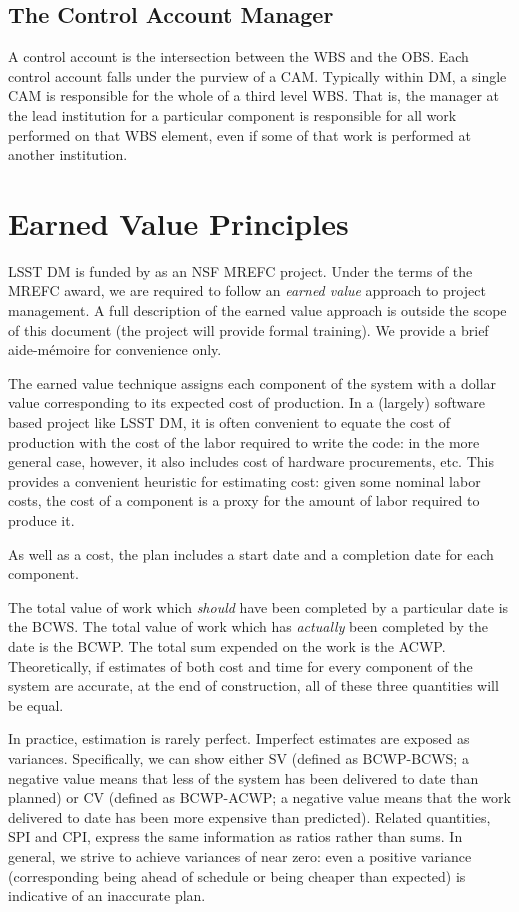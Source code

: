 \subsection{The Control Account
Manager}\label{the-control-account-manager}

A control account is the intersection between the WBS and the OBS. Each
control account falls under the purview of a CAM. Typically within DM, a
single CAM is responsible for the whole of a third level WBS. That is,
the manager at the lead institution for a particular component is
responsible for all work performed on that WBS element, even if some of
that work is performed at another institution.

\section{Earned Value Principles}
\label{sec:evms}

LSST DM is funded by as an NSF MREFC project. Under the terms of the
MREFC award, we are required to follow an \emph{earned value} approach
to project management. A full description of the earned value approach
is outside the scope of this document (the project will provide formal
training). We provide a brief aide-mémoire for convenience only.

The earned value technique assigns each component of the system with a
dollar value corresponding to its expected cost of production. In a
(largely) software based project like LSST DM, it is often convenient to
equate the cost of production with the cost of the labor required to
write the code: in the more general case, however, it also includes cost
of hardware procurements, etc. This provides a convenient heuristic for
estimating cost: given some nominal labor costs, the cost of a component
is a proxy for the amount of labor required to produce it.

As well as a cost, the plan includes a start date and a completion date
for each component.

The total value of work which \emph{should} have been completed by a
particular date is the BCWS. The total value of work which has
\emph{actually} been completed by the date is the BCWP. The total sum
expended on the work is the ACWP. Theoretically, if estimates of both
cost and time for every component of the system are accurate, at the end
of construction, all of these three quantities will be equal.

In practice, estimation is rarely perfect. Imperfect estimates are
exposed as variances. Specifically, we can show either SV (defined as
BCWP-BCWS; a negative value means that less of the system has been
delivered to date than planned) or CV (defined as BCWP-ACWP; a negative
value means that the work delivered to date has been more expensive than
predicted). Related quantities, SPI and CPI, express the same
information as ratios rather than sums. In general, we strive to achieve
variances of near zero: even a positive variance (corresponding being
ahead of schedule or being cheaper than expected) is indicative of an
inaccurate plan.

